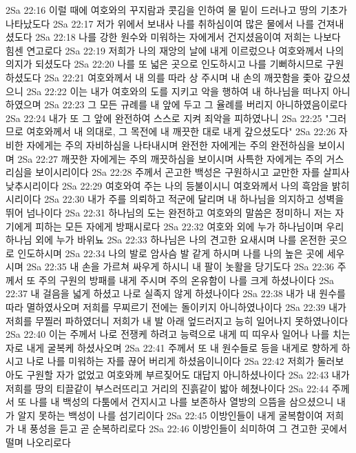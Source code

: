 2Sa 22:16  이럴 때에 여호와의 꾸지람과 콧김을 인하여 물 밑이 드러나고 땅의 기초가 나타났도다
2Sa 22:17  저가 위에서 보내사 나를 취하심이여 많은 물에서 나를 건져내셨도다
2Sa 22:18  나를 강한 원수와 미워하는 자에게서 건지셨음이여 저희는 나보다 힘센 연고로다
2Sa 22:19  저희가 나의 재앙의 날에 내게 이르렀으나 여호와께서 나의 의지가 되셨도다
2Sa 22:20  나를 또 넓은 곳으로 인도하시고 나를 기뻐하시므로 구원하셨도다
2Sa 22:21  여호와께서 내 의를 따라 상 주시며 내 손의 깨끗함을 좇아 갚으셨으니
2Sa 22:22  이는 내가 여호와의 도를 지키고 악을 행하여 내 하나님을 떠나지 아니하였으며
2Sa 22:23  그 모든 규례를 내 앞에 두고 그 율례를 버리지 아니하였음이로다
2Sa 22:24  내가 또 그 앞에 완전하여 스스로 지켜 죄악을 피하였나니
2Sa 22:25  "그러므로 여호와께서 내 의대로, 그 목전에 내 깨끗한 대로 내게 갚으셨도다"
2Sa 22:26  자비한 자에게는 주의 자비하심을 나타내시며 완전한 자에게는 주의 완전하심을 보이시며
2Sa 22:27  깨끗한 자에게는 주의 깨끗하심을 보이시며 사특한 자에게는 주의 거스리심을 보이시리이다
2Sa 22:28  주께서 곤고한 백성은 구원하시고 교만한 자를 살피사 낮추시리이다
2Sa 22:29  여호와여 주는 나의 등불이시니 여호와께서 나의 흑암을 밝히시리이다
2Sa 22:30  내가 주를 의뢰하고 적군에 달리며 내 하나님을 의지하고 성벽을 뛰어 넘나이다
2Sa 22:31  하나님의 도는 완전하고 여호와의 말씀은 정미하니 저는 자기에게 피하는 모든 자에게 방패시로다
2Sa 22:32  여호와 외에 누가 하나님이며 우리 하나님 외에 누가 바위뇨
2Sa 22:33  하나님은 나의 견고한 요새시며 나를 온전한 곳으로 인도하시며
2Sa 22:34  나의 발로 암사슴 발 같게 하시며 나를 나의 높은 곳에 세우시며
2Sa 22:35  내 손을 가르쳐 싸우게 하시니 내 팔이 놋활을 당기도다
2Sa 22:36  주께서 또 주의 구원의 방패를 내게 주시며 주의 온유함이 나를 크게 하셨나이다
2Sa 22:37  내 걸음을 넓게 하셨고 나로 실족지 않게 하셨나이다
2Sa 22:38  내가 내 원수를 따라 멸하였사오며 저희를 무찌르기 전에는 돌이키지 아니하였나이다
2Sa 22:39  내가 저희를 무찔러 파하였더니 저희가 내 발 아래 엎드러지고 능히 일어나지 못하였나이다
2Sa 22:40  이는 주께서 나로 전쟁케 하려고 능력으로 내게 띠 띠우사 일어나 나를 치는 자로 내게 굴복케 하셨사오며
2Sa 22:41  주께서 또 내 원수들로 등을 내게로 향하게 하시고 나로 나를 미워하는 자를 끊어 버리게 하셨음이니이다
2Sa 22:42  저희가 둘러보아도 구원할 자가 없었고 여호와께 부르짖어도 대답지 아니하셨나이다
2Sa 22:43  내가 저희를 땅의 티끌같이 부스러뜨리고 거리의 진흙같이 밟아 헤쳤나이다
2Sa 22:44  주께서 또 나를 내 백성의 다툼에서 건지시고 나를 보존하사 열방의 으뜸을 삼으셨으니 내가 알지 못하는 백성이 나를 섬기리이다
2Sa 22:45  이방인들이 내게 굴복함이여 저희가 내 풍성을 듣고 곧 순복하리로다
2Sa 22:46  이방인들이 쇠미하여 그 견고한 곳에서 떨며 나오리로다
